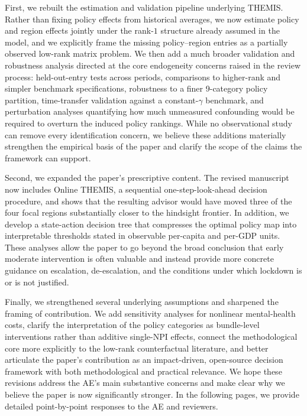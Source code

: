 \documentclass[letterpaper,twoside,11pt]{reviewresponse}
\begin{document}
First, we rebuilt the estimation and validation pipeline underlying THEMIS. Rather than fixing policy effects from historical averages, we now estimate policy and region effects jointly under the rank-$1$ structure already assumed in the model, and we explicitly frame the missing policy--region entries as a partially observed low-rank matrix problem. We then add a much broader validation and robustness analysis directed at the core endogeneity concerns raised in the review process: held-out-entry tests across periods, comparisons to higher-rank and simpler benchmark specifications, robustness to a finer 9-category policy partition, time-transfer validation against a constant-$\gamma$ benchmark, and perturbation analyses quantifying how much unmeasured confounding would be required to overturn the induced policy rankings. While no observational study can remove every identification concern, we believe these additions materially strengthen the empirical basis of the paper and clarify the scope of the claims the framework can support.

Second, we expanded the paper's prescriptive content. The revised manuscript now includes Online THEMIS, a sequential one-step-look-ahead decision procedure, and shows that the resulting advisor would have moved three of the four focal regions substantially closer to the hindsight frontier. In addition, we develop a state-action decision tree that compresses the optimal policy map into interpretable thresholds stated in observable per-capita and per-GDP units. These analyses allow the paper to go beyond the broad conclusion that early moderate intervention is often valuable and instead provide more concrete guidance on escalation, de-escalation, and the conditions under which lockdown is or is not justified.

Finally, we strengthened several underlying assumptions and sharpened the framing of contribution. We add sensitivity analyses for nonlinear mental-health costs, clarify the interpretation of the policy categories as bundle-level interventions rather than additive single-NPI effects, connect the methodological core more explicitly to the low-rank counterfactual literature, and better articulate the paper's contribution as an impact-driven, open-source decision framework with both methodological and practical relevance. We hope these revisions address the AE's main substantive concerns and make clear why we believe the paper is now significantly stronger. In the following pages, we provide detailed point-by-point responses to the AE and reviewers.
\end{document}
